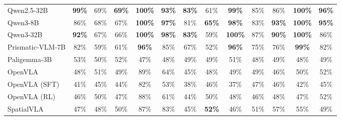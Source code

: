 \documentclass[11pt]{article}
\newcommand{\heatDG}[1]{\cellcolor{mydarkgreen}\textbf{#1}}
\newcommand{\heatG}[1]{\cellcolor{mygreen}#1}
\newcommand{\heatLG}[1]{\cellcolor{mylightgreen}#1}
\newcommand{\heatO}[1]{\cellcolor{myorange}#1}
\newcommand{\heatR}[1]{\cellcolor{myred}#1}
\begin{document}
\begin{table}[t]
{\begin{tabular}{lcccccccccccc}
Qwen2.5-32B
& \heatDG{\textbf{99\%}} & \heatG{69\%} & \heatG{\textbf{69\%}} & \heatDG{\textbf{100\%}} & \heatDG{93\%} & \heatG{\textbf{83\%}} & \heatG{61\%} & \heatDG{99\%} & \heatG{85\%} & \heatG{86\%} & \heatDG{\textbf{100\%}} & \heatDG{96\%} \\

Qwen3-8B
& \heatG{86\%} & \heatG{68\%} & \heatG{67\%} & \heatDG{\textbf{100\%}} & \heatDG{97\%} & \heatG{81\%} & \heatG{\textbf{65\%}} & \heatDG{98\%} & \heatG{83\%} & \heatDG{\textbf{93\%}} & \heatDG{\textbf{100\%}} & \heatDG{95\%} \\

Qwen3-32B
& \heatDG{92\%} & \heatG{67\%} & \heatG{66\%} & \heatDG{\textbf{100\%}} & \heatDG{\textbf{98\%}} & \heatG{\textbf{83\%}} & \heatLG{59\%} & \heatDG{\textbf{100\%}} & \heatG{87\%} & \heatDG{90\%} & \heatDG{\textbf{100\%}} & \heatG{86\%} \\

Prismatic-VLM-7B
& \heatG{82\%} & \heatLG{59\%} & \heatG{61\%} & \heatDG{96\%} & \heatG{85\%} & \heatG{67\%} & \heatO{52\%} & \heatDG{96\%} & \heatG{75\%} & \heatG{76\%} & \heatDG{99\%} & \heatG{82\%} \\

Paligemma-3B
& \heatO{53\%} & \heatO{50\%} & \heatO{52\%} & \heatO{47\%} & \heatO{48\%} & \heatO{49\%} & \heatO{49\%} & \heatO{51\%} & \heatO{48\%} & \heatO{49\%} & \heatO{48\%} & \heatO{49\%} \\
\midrule
OpenVLA
& \heatO{48\%} & \heatO{51\%} & \heatO{49\%} & \heatG{89\%} & \heatG{64\%} & \heatR{45\%} & \heatO{48\%} & \heatO{49\%} & \heatO{49\%} & \heatO{46\%} & \heatO{50\%} & \heatO{52\%} \\

OpenVLA (SFT)
& \heatR{41\%} & \heatR{45\%} & \heatR{44\%} & \heatG{82\%} & \heatO{53\%} & \heatR{38\%} & \heatO{46\%} & \heatR{37\%} & \heatO{47\%} & \heatO{46\%} & \heatR{42\%} & \heatR{45\%} \\

OpenVLA (RL)
& \heatO{46\%} & \heatO{50\%} & \heatO{47\%} & \heatG{88\%} & \heatG{61\%} & \heatR{44\%} & \heatO{50\%} & \heatO{48\%} & \heatO{46\%} & \heatO{48\%} & \heatO{47\%} & \heatO{52\%} \\

SpatialVLA
& \heatO{47\%} & \heatO{48\%} & \heatO{50\%} & \heatG{87\%} & \heatG{83\%} & \heatR{45\%} & \heatO{\textbf{52\%}} & \heatO{46\%} & \heatO{51\%} & \heatLG{57\%} & \heatLG{55\%} & \heatO{49\%} \\


\end{tabular}}
\end{table}
\end{document}
